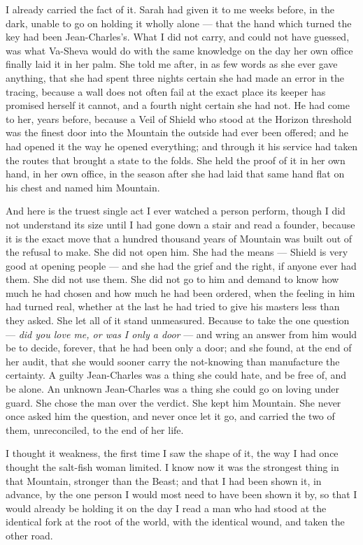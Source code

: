 I already carried the fact of it. Sarah had given it to me weeks before, in the dark, unable to go on holding it wholly alone --- that the hand which turned the key had been Jean-Charles's. What I did not carry, and could not have guessed, was what Va-Sheva would do with the same knowledge on the day her own office finally laid it in her palm. She told me after, in as few words as she ever gave anything, that she had spent three nights certain she had made an error in the tracing, because a wall does not often fail at the exact place its keeper has promised herself it cannot, and a fourth night certain she had not. He had come to her, years before, because a Veil of Shield who stood at the Horizon threshold was the finest door into the Mountain the outside had ever been offered; and he had opened it the way he opened everything; and through it his service had taken the routes that brought a state to the folds. She held the proof of it in her own hand, in her own office, in the season after she had laid that same hand flat on his chest and named him Mountain.\par

And here is the truest single act I ever watched a person perform, though I did not understand its size until I had gone down a stair and read a founder, because it is the exact move that a hundred thousand years of Mountain was built out of the refusal to make. She did not open him. She had the means --- Shield is very good at opening people --- and she had the grief and the right, if anyone ever had them. She did not use them. She did not go to him and demand to know how much he had chosen and how much he had been ordered, when the feeling in him had turned real, whether at the last he had tried to give his masters less than they asked. She let all of it stand unmeasured. Because to take the one question --- \emph{did you love me, or was I only a door} --- and wring an answer from him would be to decide, forever, that he had been only a door; and she found, at the end of her audit, that she would sooner carry the not-knowing than manufacture the certainty. A guilty Jean-Charles was a thing she could hate, and be free of, and be alone. An unknown Jean-Charles was a thing she could go on loving under guard. She chose the man over the verdict. She kept him Mountain. She never once asked him the question, and never once let it go, and carried the two of them, unreconciled, to the end of her life.\par

I thought it weakness, the first time I saw the shape of it, the way I had once thought the salt-fish woman limited. I know now it was the strongest thing in that Mountain, stronger than the Beast; and that I had been shown it, in advance, by the one person I would most need to have been shown it by, so that I would already be holding it on the day I read a man who had stood at the identical fork at the root of the world, with the identical wound, and taken the other road.\par

